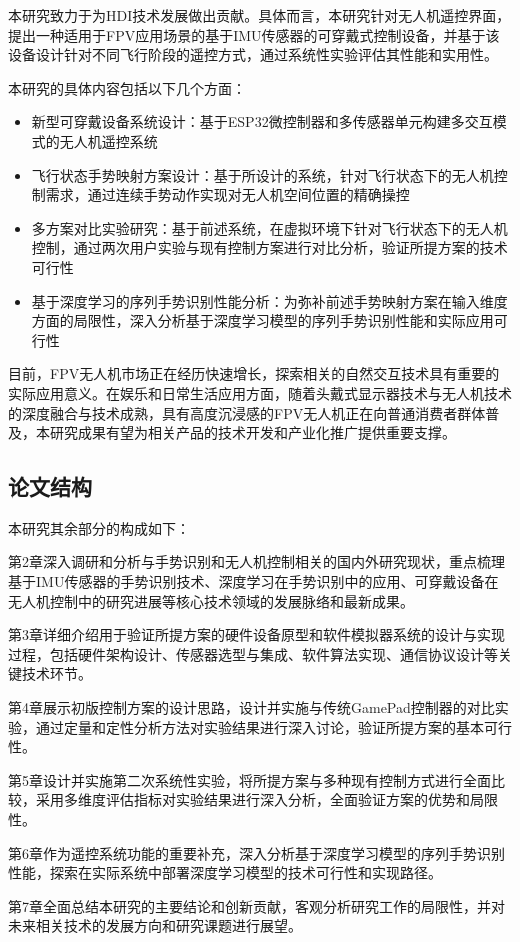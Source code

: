 本研究致力于为HDI技术发展做出贡献。具体而言，本研究针对无人机遥控界面，提出一种适用于FPV应用场景的基于IMU传感器的可穿戴式控制设备，并基于该设备设计针对不同飞行阶段的遥控方式，通过系统性实验评估其性能和实用性。

本研究的具体内容包括以下几个方面：

\begin{itemize}
    \item 新型可穿戴设备系统设计：基于ESP32微控制器和多传感器单元构建多交互模式的无人机遥控系统
    \item 飞行状态手势映射方案设计：基于所设计的系统，针对飞行状态下的无人机控制需求，通过连续手势动作实现对无人机空间位置的精确操控
    \item 多方案对比实验研究：基于前述系统，在虚拟环境下针对飞行状态下的无人机控制，通过两次用户实验与现有控制方案进行对比分析，验证所提方案的技术可行性
    \item 基于深度学习的序列手势识别性能分析：为弥补前述手势映射方案在输入维度方面的局限性，深入分析基于深度学习模型的序列手势识别性能和实际应用可行性
\end{itemize}

目前，FPV无人机市场正在经历快速增长，探索相关的自然交互技术具有重要的实际应用意义。在娱乐和日常生活应用方面，随着头戴式显示器技术与无人机技术的深度融合与技术成熟，具有高度沉浸感的FPV无人机正在向普通消费者群体普及，本研究成果有望为相关产品的技术开发和产业化推广提供重要支撑。

\subsection{论文结构}

本研究其余部分的构成如下：

第2章深入调研和分析与手势识别和无人机控制相关的国内外研究现状，重点梳理基于IMU传感器的手势识别技术、深度学习在手势识别中的应用、可穿戴设备在无人机控制中的研究进展等核心技术领域的发展脉络和最新成果。

第3章详细介绍用于验证所提方案的硬件设备原型和软件模拟器系统的设计与实现过程，包括硬件架构设计、传感器选型与集成、软件算法实现、通信协议设计等关键技术环节。

第4章展示初版控制方案的设计思路，设计并实施与传统GamePad控制器的对比实验，通过定量和定性分析方法对实验结果进行深入讨论，验证所提方案的基本可行性。

第5章设计并实施第二次系统性实验，将所提方案与多种现有控制方式进行全面比较，采用多维度评估指标对实验结果进行深入分析，全面验证方案的优势和局限性。

第6章作为遥控系统功能的重要补充，深入分析基于深度学习模型的序列手势识别性能，探索在实际系统中部署深度学习模型的技术可行性和实现路径。

第7章全面总结本研究的主要结论和创新贡献，客观分析研究工作的局限性，并对未来相关技术的发展方向和研究课题进行展望。


\ifx\allfiles\undefined

\fi
